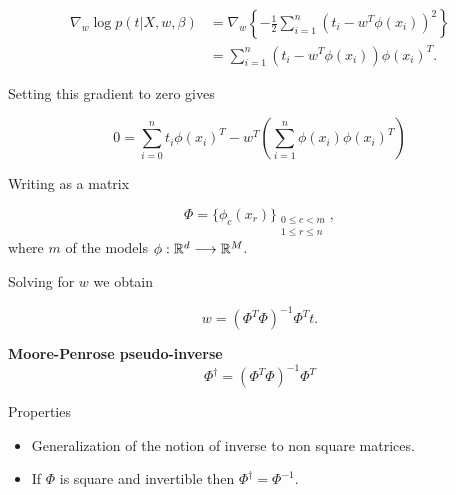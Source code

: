 \begin{frame}
  \begin{align}
    \nabla_w \log p(t|X,w, \beta) 
    &= 
    \nabla_w 
    \left\{ 
      - \frac{1}{2} 
      \sum_{i = 1}^n
      (t_i - w^T \phi(x_i))^2
    \right\}
    \\
    &= 
    \sum _{i=1}^n
    (t_i - w^T \phi(x_i))
    \phi(x_i)^T.
  \end{align}

  Setting this gradient to zero gives 

  \begin{equation}
    0 
    = 
    \sum_{i = 0}^n
    t_i \phi(x_i)^T
    - 
    w^T
    \left(
      \sum_{i=1}^n
      \phi(x_i)
      \phi(x_i)^T
    \right)
  \end{equation}
\end{frame}

\begin{frame}
  Writing as a matrix 

  \begin{equation}
    \Phi = \{ \phi_c(x_r)\}_{
        \substack{ 
          0 \leq c < m\\
          1 \leq r \leq n
        }
    },
  \end{equation}
  where $m$ of the models $\phi: \mathbb{R}^d \longrightarrow \mathbb{R}^M$. 

  Solving for $w$ we obtain 

  \begin{equation}
    w = 
    \left(
      \Phi^T \Phi
    \right)^{-1}
    \Phi^T t.
  \end{equation}
  
\end{frame}

\begin{frame}
  \begin{definition}
    \textbf{Moore-Penrose pseudo-inverse}
  \begin{equation}
    \Phi^\dagger 
    = 
    \left(
      \Phi^T \Phi
    \right)^{-1}
    \Phi^T
  \end{equation}
\end{definition}
  Properties
  \begin{itemize}
    \item Generalization of the notion of inverse to non square matrices.
    \item If $\Phi$ is square and invertible then $\Phi^\dagger =  \Phi^{-1}$. 
  \end{itemize}
\end{frame}

